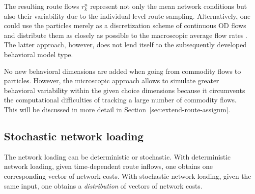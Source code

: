 The resulting route flows $r_k^{n}$
represent not only the mean network conditions
but also their variability due to the individual-level
route sampling.
Alternatively, one could use the particles merely as a 
discretization scheme of continuous
OD flows and distribute them as closely as possible to the
macroscopic average flow rates \citep[e.g.,][]{zhang-2008}.
The latter approach, however, does not lend itself to
the subsequently developed behavioral model type.


No new behavioral dimensions are added when going from commodity
flows to particles. However, the microscopic approach allows
to simulate greater behavioral variability within the given
choice dimensions because it circumvents the computational
difficulties of tracking a large number of commodity flows.  This will
be discussed in more detail in Section~\ref{sec:extend-route-assignm}.


\subsection{Stochastic network loading}
\label{sec:stoch-netw-load}

The network loading can be deterministic or stochastic.  
%
With deterministic network loading, given time-dependent route inflows,
one obtains one corresponding vector of network costs.
%
%
With stochastic network loading, given the same input, one obtains a
\emph{distribution} of vectors of network costs.

